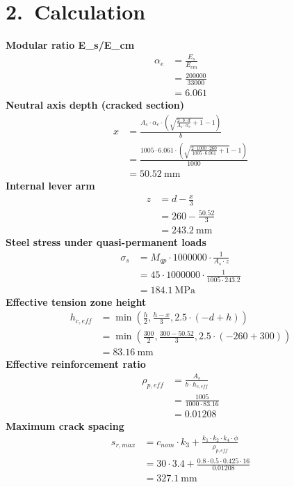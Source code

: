 \documentclass[11pt,a4paper]{article}
\begin{document}
\section*{\color{BrandPrimary}2.\ Calculation}
\noindent\textbf{Modular ratio E\_s/E\_cm}
\begin{align*}
\alpha_{e} &= \frac{E_{s}}{E_{cm}} \\
&= \frac{200000}{33000} \\
&= \mathbf{6.061}
\end{align*}
\noindent\textbf{Neutral axis depth (cracked section)}
\begin{align*}
x &= \frac{A_{s} \cdot \alpha_{e} \cdot \left(\sqrt{\frac{2 \cdot b \cdot d}{A_{s} \cdot \alpha_{e}} + 1} - 1\right)}{b} \\
&= \frac{1005 \cdot 6.061 \cdot \left(\sqrt{\frac{2 \cdot 1000 \cdot 260}{1005 \cdot 6.061} + 1} - 1\right)}{1000} \\
&= \mathbf{50.52}\ \mathrm{mm}
\end{align*}
\noindent\textbf{Internal lever arm}
\begin{align*}
z &= d - \frac{x}{3} \\
&= 260 - \frac{50.52}{3} \\
&= \mathbf{243.2}\ \mathrm{mm}
\end{align*}
\noindent\textbf{Steel stress under quasi-permanent loads}
\begin{align*}
\sigma_{s} &= M_{qp} \cdot 1000000 \cdot \frac{1}{A_{s} \cdot z} \\
&= 45 \cdot 1000000 \cdot \frac{1}{1005 \cdot 243.2} \\
&= \mathbf{184.1}\ \mathrm{MPa}
\end{align*}
\noindent\textbf{Effective tension zone height}
\begin{align*}
h_{c,eff} &= \min\left(\frac{h}{2}, \frac{h - x}{3}, 2.5 \cdot \left(- d + h\right)\right) \\
&= \min\left(\frac{300}{2}, \frac{300 - 50.52}{3}, 2.5 \cdot \left(- 260 + 300\right)\right) \\
&= \mathbf{83.16}\ \mathrm{mm}
\end{align*}
\noindent\textbf{Effective reinforcement ratio}
\begin{align*}
\rho_{p,eff} &= \frac{A_{s}}{b \cdot h_{c,eff}} \\
&= \frac{1005}{1000 \cdot 83.16} \\
&= \mathbf{0.01208}
\end{align*}
\noindent\textbf{Maximum crack spacing}
\begin{align*}
s_{r,max} &= c_{nom} \cdot k_{3} + \frac{k_{1} \cdot k_{2} \cdot k_{4} \cdot \phi}{\rho_{p,eff}} \\
&= 30 \cdot 3.4 + \frac{0.8 \cdot 0.5 \cdot 0.425 \cdot 16}{0.01208} \\
&= \mathbf{327.1}\ \mathrm{mm}
\end{align*}
\end{document}
